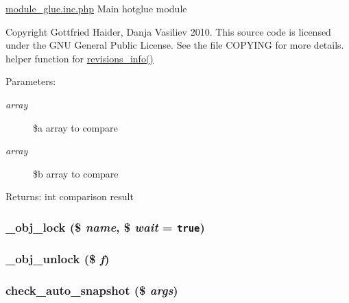 \hyperlink{module__glue_8inc_8php}{module\_\-glue.inc.php} Main hotglue module

Copyright Gottfried Haider, Danja Vasiliev 2010. This source code is licensed under the GNU General Public License. See the file COPYING for more details. helper function for \hyperlink{module__glue_8inc_8php_1dc65b69a920ac4ebc8f7c1df305060b}{revisions\_\-info()}

\begin{Desc}
\item[Parameters:]
\begin{description}
\item[{\em array}]\$a array to compare \item[{\em array}]\$b array to compare \end{description}
\end{Desc}
\begin{Desc}
\item[Returns:]int comparison result \end{Desc}
\hypertarget{module__glue_8inc_8php_21f260355b875069ca90edf1f9a559d0}{
\subsubsection[{\_\-obj\_\-lock}]{\setlength{\rightskip}{0pt plus 5cm}\_\-obj\_\-lock (\$ {\em name}, \/  \$ {\em wait} = {\tt true})}}
\label{module__glue_8inc_8php_21f260355b875069ca90edf1f9a559d0}


\hypertarget{module__glue_8inc_8php_73a91facde5362e20df9657d31c2bb06}{
\subsubsection[{\_\-obj\_\-unlock}]{\setlength{\rightskip}{0pt plus 5cm}\_\-obj\_\-unlock (\$ {\em f})}}
\label{module__glue_8inc_8php_73a91facde5362e20df9657d31c2bb06}


\hypertarget{module__glue_8inc_8php_aa1103a091b9dbca790e77d25a452ca5}{
\subsubsection[{check\_\-auto\_\-snapshot}]{\setlength{\rightskip}{0pt plus 5cm}check\_\-auto\_\-snapshot (\$ {\em args})}}
\label{module__glue_8inc_8php_aa1103a091b9dbca790e77d25a452ca5}



